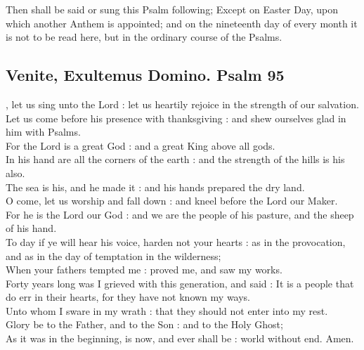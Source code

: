 

\begin{rubric}
Then shall be said or sung this Psalm following; Except on Easter Day, upon which another Anthem is appointed; and on the nineteenth day of every month it is not to be read here, but in the ordinary course of the Psalms.
\end{rubric}

\subsection{Venite, Exultemus Domino. Psalm 95}

, let us sing unto the Lord : let us heartily rejoice in the strength of our salvation.\\
Let us come before his presence with thanksgiving : and shew ourselves glad in him with Psalms.\\
For the Lord is a great God : and a great King above all gods.\\
In his hand are all the corners of the earth : and the strength of the hills is his also.\\
The sea is his, and he made it : and his hands prepared the dry land.\\
O come, let us worship and fall down : and kneel before the Lord our Maker.\\
For he is the Lord our God : and we are the people of his pasture, and the sheep of his hand.\\
To day if ye will hear his voice, harden not your hearts : as in the provocation, and as in the day of temptation in the wilderness;\\
When your fathers tempted me : proved me, and saw my works.\\
Forty years long was I grieved with this generation, and said : It is a people that do err in their hearts, for they have not known my ways.\\
Unto whom I sware in my wrath : that they should not enter into my rest.\\
Glory be to the Father, and to the Son : and to the Holy Ghost;\\
As it was in the beginning, is now, and ever shall be : world without end. Amen.

